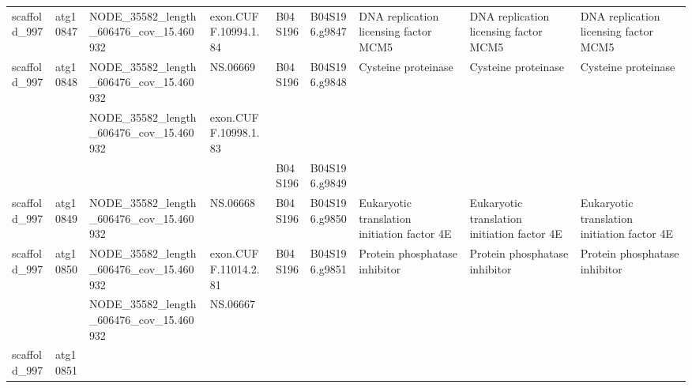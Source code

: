 \begin{longtable}{lllllllll}
   scaffold\_997 &      atg10847 &  NODE\_35582\_length\_606476\_cov\_15.460932 &  exon.CUFF.10994.1.84 &      B04S196 &  B04S196.g9847 &            DNA replication licensing factor MCM5 &            DNA replication licensing factor MCM5 &          DNA replication licensing factor MCM5 \\
   scaffold\_997 &      atg10848 &  NODE\_35582\_length\_606476\_cov\_15.460932 &              NS.06669 &      B04S196 &  B04S196.g9848 &                              Cysteine proteinase &                              Cysteine proteinase &                            Cysteine proteinase \\
                &               &  NODE\_35582\_length\_606476\_cov\_15.460932 &  exon.CUFF.10998.1.83 &              &                &                                                  &                                                  &                                                \\
                &               &                                         &                       &      B04S196 &  B04S196.g9849 &                                                  &                                                  &                                                \\
   scaffold\_997 &      atg10849 &  NODE\_35582\_length\_606476\_cov\_15.460932 &              NS.06668 &      B04S196 &  B04S196.g9850 &      Eukaryotic translation initiation factor 4E &      Eukaryotic translation initiation factor 4E &    Eukaryotic translation initiation factor 4E \\
   scaffold\_997 &      atg10850 &  NODE\_35582\_length\_606476\_cov\_15.460932 &  exon.CUFF.11014.2.81 &      B04S196 &  B04S196.g9851 &                    Protein phosphatase inhibitor &                    Protein phosphatase inhibitor &                  Protein phosphatase inhibitor \\
                &               &  NODE\_35582\_length\_606476\_cov\_15.460932 &              NS.06667 &              &                &                                                  &                                                  &                                                \\
   scaffold\_997 &      atg10851 &                                         &                       &              &                &                                                  &                                                  &                                                \\

\end{longtable}
